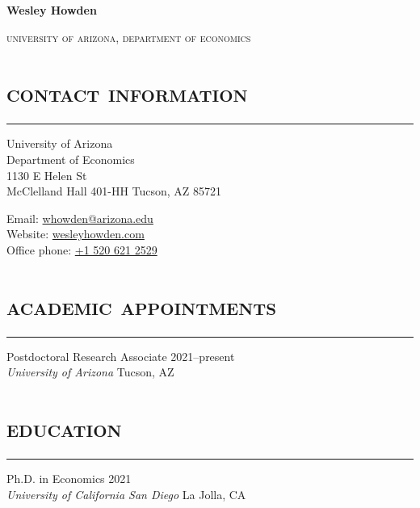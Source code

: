 \documentclass[letterpaper]{article}
\def\name{Wesley Howden}
\begin{document}
{

\centering

{\huge \bf { \name}}



}

{

\centering 
\textsc{university of arizona, department of economics}\\ \vspace{.3cm}

}





\section*{\textsc{\textbf{contact information}}}
\hrule
\vspace{.2cm}
\begin{minipage}{0.65\textwidth}
  {University of Arizona} \\
  Department of Economics \\
  1130 E Helen St \\
  McClelland Hall 401-HH
  Tucson, AZ 85721
\end{minipage}
\begin{minipage}{0.35\textwidth}
    Email:  \hfill \href{mailto:whowden@ucsd.edu}{{whowden@arizona.edu}} \\
    Website:  \hfill \href{https://wesleyhowden.com}{{{wesleyhowden.com}}} \\ 
    Office phone: \hfill \href{tel:15206212529}{+1 520 621 2529}
\end{minipage}

\section*{\textsc{\textbf{academic appointments}}}
\hrule
\vspace{0.2cm}
Postdoctoral Research Associate \hfill 2021--present \\
\emph{University of Arizona} \hfill Tucson, AZ 


\section*{\textsc{\textbf{education}}}
\hrule
\vspace{0.2cm}
Ph.D. in Economics \hfill 2021  \\
\emph{University of California San Diego} \hfill La Jolla, CA \\
\end{document}
